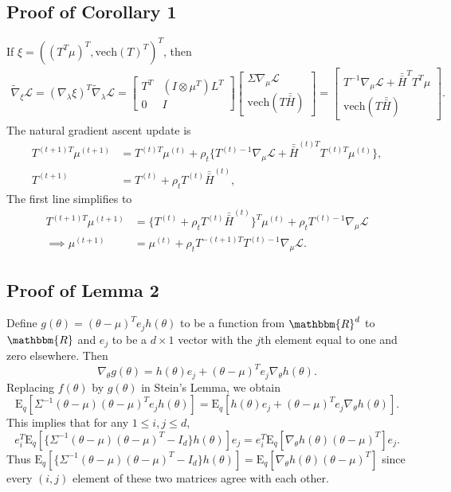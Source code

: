 \documentclass{statsoc}
\newcommand\E{{\text{E}}}
\newcommand\mL{{\mathcal{L}}}
\newcommand{\vech}{\text{vech}}
\newcommand{\dH}{\bar{\bar{H}}}
\begin{document}
\subsection{Proof of Corollary 1}
If $\xi = ((T^T \mu)^T, \vech(T)^T)^T$, then 
\begin{equation*}
\begin{aligned}
\widetilde{\nabla}_\xi \mL =  (\nabla_\lambda \xi)^T \widetilde{\nabla}_\lambda \mL 
= \begin{bmatrix} T^T & (I \otimes \mu^T) L^T \\ 0 & I \end{bmatrix}
\begin{bmatrix} \Sigma \nabla_\mu \mL \\  \vech(T \dH) \end{bmatrix} 
= \begin{bmatrix}
T^{-1} \nabla_\mu \mL + \dH^T T^T \mu \\  \vech(T \dH) \end{bmatrix}.
\end{aligned}
\end{equation*}
The natural gradient ascent update is 
\[
\begin{aligned}
T^{(t+1)T} \mu^{(t+1)} &=T^{(t)T} \mu^{(t)} + \rho_t \{ T^{(t)-1} \nabla_\mu \mL  + \dH^{(t)T} T^{(t)T} \mu^{(t)}  \},  \\
T^{(t+1)} &= T^{(t)} + \rho_t T^{(t)}  \dH^{(t)},
\end{aligned}
\]
The first line simplifies to 
\[
\begin{aligned}
T^{(t+1)T} \mu^{(t+1)} &=\{T^{(t)} + \rho_t T^{(t)}\dH^{(t)} \} ^T \mu^{(t)} + \rho_t T^{(t)-1} \nabla_\mu \mL  \\
\implies \mu^{(t+1)} &= \mu^{(t)} + \rho_t T^{-(t+1)T} T^{(t)-1} \nabla_\mu \mL.
\end{aligned}
\]


\subsection{Proof of Lemma 2}
Define $g(\theta) = (\theta - \mu) ^T e_j h(\theta)$ to be a function from $\mathbbm{R}^d$ to $\mathbbm{R}$ and $e_j$ to be a $d \times 1$ vector with the $j$th element equal to one and zero elsewhere. Then
\[
\nabla_\theta g(\theta) = h(\theta) e_j  +  (\theta - \mu) ^T e_j \nabla_\theta h(\theta).
\] 
Replacing $f(\theta)$ by $g(\theta)$ in Stein's Lemma, we obtain
\[
\E_q[\Sigma^{-1} (\theta-\mu)  (\theta - \mu) ^T e_j h(\theta)] =  \E_q[h(\theta) e_j  +  (\theta - \mu) ^T e_j \nabla_\theta h(\theta)].
\]
This implies that for any $1 \leq i,j \leq d$, 
\[
e_i^T \E_q[\{\Sigma^{-1} (\theta-\mu)  (\theta - \mu) ^T - I_d\}  h(\theta)]e_j =  e_i^T \E_q[ \nabla_\theta h(\theta)(\theta - \mu) ^T] e_j.
\]
Thus $\E_q[\{\Sigma^{-1} (\theta-\mu)  (\theta - \mu) ^T - I_d\}  h(\theta)] =  \E_q[ \nabla_\theta h(\theta)(\theta - \mu) ^T]$ since every $(i,j)$ element of these two matrices agree with each other.
\end{document}
